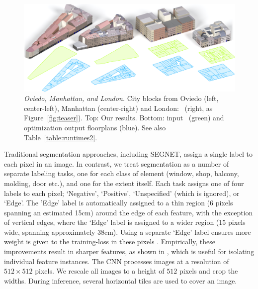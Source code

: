 \begin{figure}[t!]
    \centering
    \includegraphics[width=\linewidth]{../images/results/results.png}
    \vspace*{-.1in}
    \caption{{\it Oviedo, Manhattan, and London.} City blocks from Oviedo (left, center-left), Manhattan (center-right) and London: \LondonRS\ (right, as Figure~\ref{fig:teaser}). Top: Our results. Bottom: input \GISds~(green) and optimization output floorplans (blue). See also Table~\ref{table:runtimes2}.}
    \label{fig:results}
\end{figure}

Traditional segmentation approaches, including SEGNET, assign a single label to each pixel in an image. In contrast, we treat \facade segmentation as a number of separate labeling tasks, one for each class of \facade element (window, shop, balcony, molding, door etc.), and one for the \facade extent itself. Each task assigns one of four labels to each pixel; 
`Negative', `Positive', `Unspecified' (which is ignored), or `Edge'. The 'Edge' label is automatically  assigned to a thin region (6 pixels spanning an estimated 15cm) around the edge of each feature, with the exception of vertical \facade edges, where the `Edge' label is assigned to a wider region (15 pixels wide, spanning approximately 38cm). Using a separate `Edge' label ensures more weight is given to the training-loss in these pixels . 
Empirically, these improvements result in sharper features, as shown in , which is useful for isolating individual feature instances. The CNN processes images at a resolution of $512 \times 512$ pixels. We rescale all images to a height of $512$ pixels and crop the widths. During inference, several horizontal tiles are used to cover an image.



